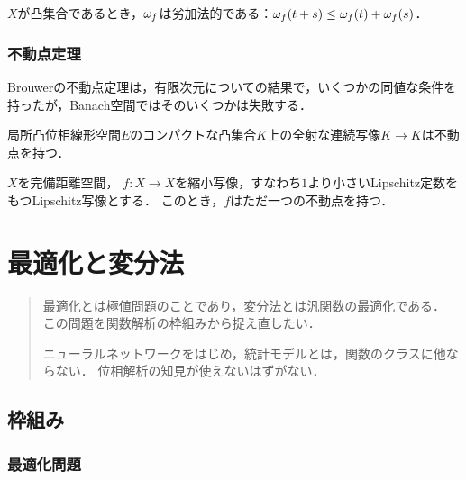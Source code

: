 \documentclass[uplatex,dvipdfmx]{jsreport}
\begin{document}
\begin{lemma}
    $X$が凸集合であるとき，$\omega_f$は劣加法的である：$\omega_f(t+s)\le\omega_f(t)+\omega_f(s)$．
\end{lemma}

\subsection{不動点定理}

\begin{tcolorbox}[colframe=ForestGreen, colback=ForestGreen!10!white,breakable,colbacktitle=ForestGreen!40!white,coltitle=black,fonttitle=\bfseries\sffamily,
title=]
    Brouwerの不動点定理は，有限次元についての結果で，いくつかの同値な条件を持ったが，Banach空間ではそのいくつかは失敗する．
\end{tcolorbox}

\begin{theorem}
    局所凸位相線形空間$E$のコンパクトな凸集合$K$上の全射な連続写像$K\to K$は不動点を持つ．
\end{theorem}

\begin{theorem}[Banach (22)]
    $X$を完備距離空間，
    $f:X\to X$を縮小写像，すなわち$1$より小さいLipschitz定数をもつLipschitz写像とする．
    このとき，$f$はただ一つの不動点を持つ．
\end{theorem}

\chapter{最適化と変分法}

\begin{quotation}
    最適化とは極値問題のことであり，変分法とは汎関数の最適化である．
    この問題を関数解析の枠組みから捉え直したい．

    ニューラルネットワークをはじめ，統計モデルとは，関数のクラスに他ならない．
    位相解析の知見が使えないはずがない．
\end{quotation}

\section{枠組み}

\subsection{最適化問題}
\end{document}
